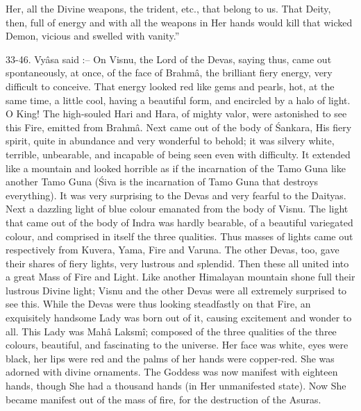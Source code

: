 Her, all the Divine weapons, the trident, etc., that belong to us. That Deity, then, full of energy and with all the weapons in Her hands would kill that wicked Demon, vicious and swelled with vanity.''

33-46. Vy\^asa said :-- On Visnu, the Lord of the Devas, saying thus, came out spontaneously, at once, of the face of Brahm\^a, the brilliant fiery energy, very difficult to conceive. That energy looked red like gems and pearls, hot, at the same time, a little cool, having a beautiful form, and encircled by a halo of light. O King! The high-souled Hari and Hara, of mighty valor, were astonished to see this Fire, emitted from Brahm\^a. Next came out of the body of \'Sankara, His fiery spirit, quite in abundance and very wonderful to behold; it was silvery white, terrible, unbearable, and incapable of being seen even with difficulty. It extended like a mountain and looked horrible as if the incarnation of the Tamo Guna like another Tamo Guna (\'Siva is the incarnation of Tamo Guna that destroys everything). It was very surprising to the Devas and very fearful to the Daityas. Next a dazzling light of blue colour emanated from the body of Visnu. The light that came out of the body of Indra was hardly bearable, of a beautiful variegated colour, and comprised in itself the three qualities. Thus masses of lights came out respectively from Kuvera, Yama, Fire and Varuna. The other Devas, too, gave their shares of fiery lights, very lustrous and splendid. Then these all united into a great Mass of Fire and Light. Like another Himalayan mountain shone full their lustrous Divine light; Visnu and the other Devas were all extremely surprised to see this. While the Devas were thus looking steadfastly on that Fire, an exquisitely handsome Lady was born out of it, causing excitement and wonder to all. This Lady was Mah\^a Laksm\^i; composed of the three qualities of the three colours, beautiful, and fascinating to the universe. Her face was white, eyes were black, her lips were red and the palms of her hands were copper-red. She was adorned with divine ornaments. The Goddess was now manifest with eighteen hands, though She had a thousand hands (in Her unmanifested state). Now She became manifest out of the mass of fire, for the destruction of the Asuras.

